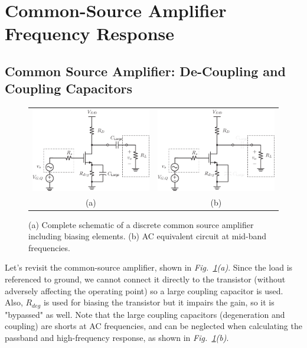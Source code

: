 \section{Common-Source Amplifier Frequency Response}
\subsection{Common Source Amplifier: De-Coupling and Coupling Capacitors}
\begin{figure}[tb]
\centering
\begin{tabular}{cc}
\includegraphics[width=.45\columnwidth]{cs_amp_acdc_RC_degen} &
\includegraphics[width=.45\columnwidth]{cs_amp_acdc_RC_degen_capsshorted}\\
(a) & (b)\\
\end{tabular}
\caption{(a) Complete schematic of a discrete common source amplifier including biasing elements.  (b) AC equivalent circuit at mid-band frequencies.}
\label{fig:cs_amp_acdc_RC_degen_capsshorted}
\end{figure}
Let's revisit the common-source amplifier, shown in \emph{Fig.~\ref{fig:cs_amp_acdc_RC_degen_capsshorted}(a)}.  Since the load is referenced to ground, we cannot connect it directly to the transistor (without adversely affecting the operating point) so a large coupling capacitor is used.  Also, $R_{deg}$ is used for biasing the transistor but it impairs the gain, so it is "bypassed" as well.  Note that the large coupling capacitors (degeneration and coupling) are shorts at AC frequencies, and can be neglected when calculating the passband and high-frequency response, as shown in \emph{Fig.~\ref{fig:cs_amp_acdc_RC_degen_capsshorted}(b)}.
